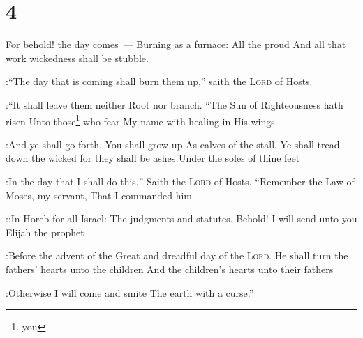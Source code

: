 \section{4}\label{Malachi 4}
\begin{enumerate}[align=center]
     For behold! the day comes~--- Burning as a furnace: All the proud And all that work wickedness shall be stubble.

:``The day that is coming shall burn them up,'' saith the \textsc{Lord} of Hosts.

:``It shall leave them neither Root nor branch.%
     ``The Sun of Righteousness hath risen Unto those\footnote{you} who fear My name with healing in His wings.

:And ye shall go forth. You shall grow up As calves of the stall.%
     Ye shall tread down the wicked for they shall be ashes Under the soles of thine feet

:In the day that I shall do this,'' Saith the \textsc{Lord} of Hosts.%
     ``Remember the Law of Moses, my servant, That I commanded him

::In Horeb for all Israel: The judgments and statutes.%
     Behold! I will send unto you Elijah the prophet

:Before the advent of the Great and dreadful day of the \textsc{Lord}.%
     He shall turn the fathers' hearts unto the children And the children's hearts unto their fathers

:Otherwise I will come and smite The earth with a curse.''%
\end{enumerate}
